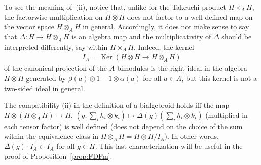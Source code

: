 \documentclass[10pt,a4paper]{amsart}
\numberwithin{equation}{section}
\begin{document}
To see the meaning of~(ii), notice that, unlike for the Takeuchi product $H\times_A H$, the factorwise multiplication on $H\otimes H$ does not factor to a well defined map on the vector space $H\otimes_A H$ in general. Accordingly, it does not make sense to say that $\Delta\colon H\to H\otimes_A H$ is an algebra map and the multiplicativity of $\Delta$ should be interpreted differently, say within $H\times_A H$. Indeed, the kernel
\begin{gather}\label{eq:IA}
I_A = \operatorname{Ker} (H\otimes H\to H\otimes_A H )
\end{gather}
of the canonical projection of the $A$-bimodules is the right ideal in the algebra $H\otimes H$ generated by $\beta(a)\otimes 1 - 1\otimes\alpha(a)$ for all $a\in A$, but this kernel is not a two-sided ideal in general.

The compatibility (ii) in the definition of a bialgebroid holds iff the map $H\otimes(H\otimes_A H)\to H$, $(g,\sum_i h_i\otimes k_i)\mapsto\Delta(g)(\sum_i h_i\otimes k_i)$ (multiplied in each tensor factor) is well defined (does not depend on the choice of the sum within
the equivalence class in $H\otimes_A H = H\otimes H/I_A$). In other words, $\Delta(g)\cdot I_A\subset I_A$ for all $g\in H$. This last characterization will be useful in the proof of Proposition~\ref{prop:FDFm}.
\end{document}
